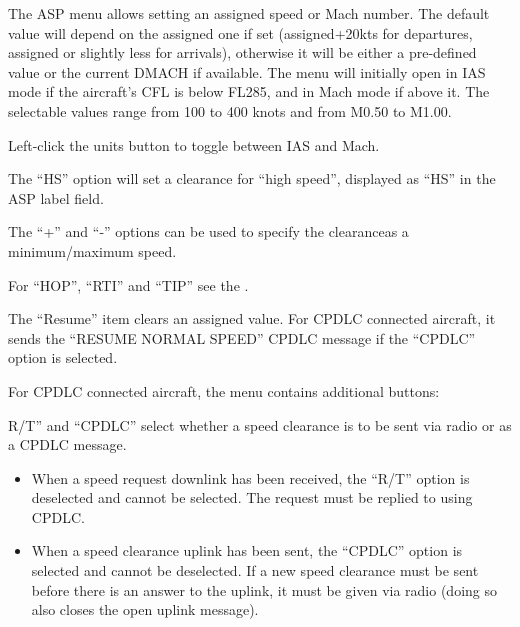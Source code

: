 \documentclass[a4paper,oneside,11pt]{memoir}
\begin{document}
\bigskip

The ASP menu allows setting an assigned speed or Mach number. The default value will depend on the assigned one if set (assigned+20kts for departures, assigned or slightly less for arrivals), otherwise it will be either a pre-defined value or the current DMACH if available. The menu will initially open in IAS mode if the aircraft’s CFL is below FL285, and in Mach mode if above it. The selectable values range from 100 to 400 knots and from M0.50 to M1.00.

\bigskip

Left-click the units button to toggle between IAS and Mach.

\bigskip

The “HS” option will set a clearance for “high speed”, displayed as “HS” in the ASP label field.

\bigskip

The “+” and “-” options can be used to specify the clearanceas a minimum/maximum speed.

\bigskip

For “HOP”, “RTI” and “TIP” see the .

\bigskip

The “Resume” item clears an assigned value. For CPDLC connected aircraft, it sends the “RESUME NORMAL SPEED” CPDLC message if the “CPDLC” option is selected.


For CPDLC connected aircraft, the menu contains additional buttons:

\bigskip

R/T” and “CPDLC” select whether a speed clearance is to be sent via radio or as a CPDLC message.

\bigskip

\begin{itemize}
    \item When a speed request downlink has been received, the “R/T” option is deselected and cannot be selected. The request must be replied to using CPDLC.
    \item When a speed clearance uplink has been sent, the “CPDLC” option is selected and cannot be deselected. If a new speed clearance must be sent before there is an answer to the uplink, it must be given via radio (doing so also closes the open uplink message).
\end{itemize}

\bigskip
\end{document}

